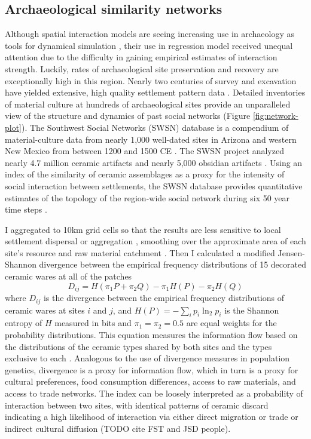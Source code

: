 \documentclass[10pt]{iopart}
\begin{document}
\subsection*{Archaeological similarity networks}
Although spatial interaction models are seeing increasing use in archaeology as tools for dynamical simulation \parencite{Bevan2013, Evans2011}, their use in regression model received unequal attention \parencite{Johnson1990ChumashAnalysis,Tobler1971,Hodder1974} due to the difficulty in gaining empirical estimates of interaction strength. Luckily, rates of archaeological site preservation and recovery are exceptionally high in this region. Nearly two centuries of survey and excavation have yielded extensive, high quality settlement pattern data \parencite{Hill2004}. Detailed inventories of material culture at hundreds of archaeological sites provide an unparalleled view of the structure and dynamics of past social networks (Figure \ref{fig:network-plot}). The Southwest Social Networks (SWSN) database is a compendium of material-culture data from nearly 1,000 well-dated sites in Arizona and western New Mexico from between 1200 and 1500 CE \parencite{Mills2012,Mills2013a,Peeples2013,Borck2015,Hill2015,Mills2015a}. The SWSN project analyzed nearly 4.7 million ceramic artifacts and nearly 5,000 obsidian artifacts \parencite{Mills2015a}. Using an index of the similarity of ceramic assemblages as a proxy for the intensity of social interaction between settlements, the SWSN database provides quantitative estimates of the topology of the region-wide social network during six 50 year time steps \parencite{Mills2013a}. 

I aggregated to 10km grid cells so that the results are less sensitive to local settlement dispersal or aggregation \parencite{Paliou2016}, smoothing over the approximate area of each site's resource and raw material catchment \parencite{Varien1999}. Then I calculated a modified Jensen-Shannon divergence between the empirical frequency distributions of 15 decorated ceramic wares at all of the patches
\begin{equation}
    D_{ij} = H\left(\pi_1P + \pi_2Q\right) - \pi_1H(P) - \pi_2H(Q)
\end{equation}
where $D_{ij}$ is the divergence between the empirical frequency distributions of ceramic wares at sites $i$ and $j$, and $H(P) = -\sum_i p_i \ln_2 p_i$ is the Shannon entropy of $H$ measured in bits and $\pi_1 = \pi_2 = 0.5$ are equal weights for the probability distributions. This equation measures the information flow based on the distributions of the ceramic types shared by both sites and the types exclusive to each \parencite{Masucci2011,PaoloMasucci2012}. Analogous to the use of divergence measures in population genetics, divergence is a proxy for information flow, which in turn is a proxy for cultural preferences, food consumption differences, access to raw materials, and access to trade networks. The index can be loosely interpreted as a probability of interaction between two sites, with identical patterns of ceramic discard indicating a high likelihood of interaction via either direct migration or trade or indirect cultural diffusion (TODO cite FST and JSD people).
\end{document}
